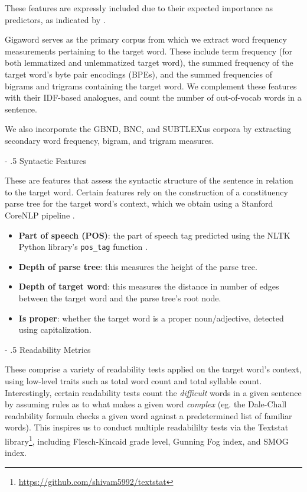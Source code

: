 \documentclass[11pt,a4paper]{article}
\makeatletter
\renewcommand\paragraph{%
    \@startsection{paragraph}{4}{0mm}%
        {-\baselineskip}%
        {.5\baselineskip}%
        {\normalfont\normalsize\bfseries}}
\makeatother
\begin{document}
These features are expressly included due to their expected importance as predictors, as indicated by \citet{zampieriEtAl:2017:NLPTEA}.

Gigaword serves as the primary corpus from which we extract word frequency measurements pertaining to the target word. These include term frequency (for both lemmatized and unlemmatized target word), the summed frequency of the target word's byte pair encodings (BPEs), and the summed frequencies of bigrams and trigrams containing the target word. We complement these features with their IDF-based analogues, and count the number of out-of-vocab words in a sentence.

We also incorporate the GBND, BNC, and SUBTLEXus corpora by extracting secondary word frequency, bigram, and trigram measures. 

\paragraph{Syntactic Features}

These are features that assess the syntactic structure of the sentence in relation to the target word. Certain features rely on the construction of a constituency parse tree for the target word's context, which we obtain using a Stanford CoreNLP pipeline \citep{manning-EtAl:2014:P14-5}.

\begin{itemize}
  \item \textbf{Part of speech (POS)}: the part of speech tag predicted using the NLTK Python library's \texttt{pos\_tag} function \citep{Loper02nltk:the}.
  \item \textbf{Depth of parse tree}: this measures the height of the parse tree.
  \item \textbf{Depth of target word}: this measures the distance in number of edges between the target word and the parse tree's root node.
  \item \textbf{Is proper}: whether the target word is a proper noun/adjective, detected using capitalization.
\end{itemize}

\paragraph{Readability Metrics}

These comprise a variety of readability tests applied on the target word's context, using low-level traits such as total word count and total syllable count. Interestingly, certain readability tests count the \textit{difficult} words in a given sentence by assuming rules as to what makes a given word \textit{complex} (eg. the Dale-Chall readability formula \citep{10.2307/1473169} checks a given word against a predetermined list of familiar words). This inspires us to conduct multiple readabililty tests via the Textstat library\footnote{\url{https://github.com/shivam5992/textstat}}, including Flesch-Kincaid grade level, Gunning Fog index, and SMOG index.
\end{document}
